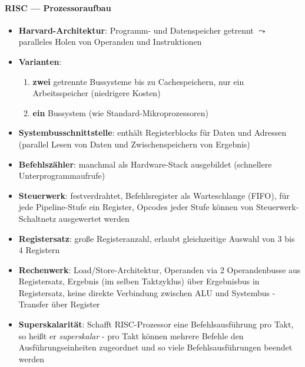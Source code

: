 \paragraph{RISC --- Prozessoraufbau}
\begin{itemize}
	\item \textbf{Harvard-Architektur}: Programm- und Datenspeicher getrennt $\leadsto$ paralleles Holen von Operanden und Instruktionen
	\item \textbf{Varianten}:
	\begin{enumerate}
		\item \textbf{zwei} getrennte Bussysteme bis zu Cachespeichern, nur ein Arbeitsspeicher (niedrigere Kosten)
		\item \textbf{ein} Bussystem (wie Standard-Mikroprozessoren)
	\end{enumerate}
	\item \textbf{Systembusschnittstelle}: enthält Registerblocks für Daten und Adressen (parallel Lesen von Daten und Zwischenspeichern von Ergebnis)
	\item \textbf{Befehlszähler}: manchmal als Hardware-Stack ausgebildet (schnellere Unterprogrammaufrufe)
	\item \textbf{Steuerwerk}: festverdrahtet, Befehlsregister als Warteschlange (FIFO), für jede Pipeline-Stufe ein Register, Opcodes jeder Stufe können von Steuerwerk-Schaltnetz ausgewertet werden
	\item \textbf{Registersatz}: große Registeranzahl, erlaubt gleichzeitige Auswahl von 3 bis 4 Registern
	\item \textbf{Rechenwerk}: Load/Store-Architektur, Operanden via 2 Operandenbusse aus Registersatz, Ergebnis (im selben Taktzyklus) über Ergebnisbus in Registersatz, keine direkte Verbindung zwischen ALU und Systembus - Transfer über Register
	\item \textbf{Superskalarität}: Schafft RISC-Prozessor eine Befehlsausführung pro Takt, so heißt er \emph{superskalar} - pro Takt können mehrere Befehle den Ausführungseinheiten zugeordnet und so viele Befehlsausführungen beendet werden
\end{itemize}